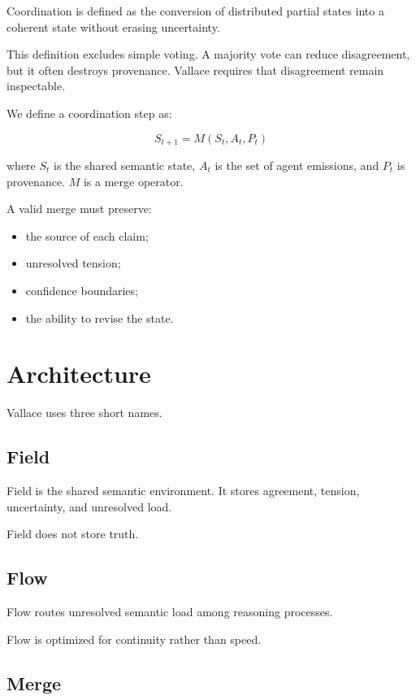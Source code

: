 \documentclass[11pt]{article}
\begin{document}
Coordination is defined as the conversion of distributed partial states into a
coherent state without erasing uncertainty.

This definition excludes simple voting. A majority vote can reduce
disagreement, but it often destroys provenance. Vallace requires that
disagreement remain inspectable.

We define a coordination step as:

\begin{equation}
S_{t+1} = M(S_t, A_t, P_t)
\end{equation}

where $S_t$ is the shared semantic state, $A_t$ is the set of agent emissions,
and $P_t$ is provenance. $M$ is a merge operator.

A valid merge must preserve:

\begin{itemize}
  \item the source of each claim;
  \item unresolved tension;
  \item confidence boundaries;
  \item the ability to revise the state.
\end{itemize}

\section{Architecture}

Vallace uses three short names.

\subsection{Field}

Field is the shared semantic environment. It stores agreement, tension,
uncertainty, and unresolved load.

Field does not store truth.

\subsection{Flow}

Flow routes unresolved semantic load among reasoning processes.

Flow is optimized for continuity rather than speed.

\subsection{Merge}
\end{document}
